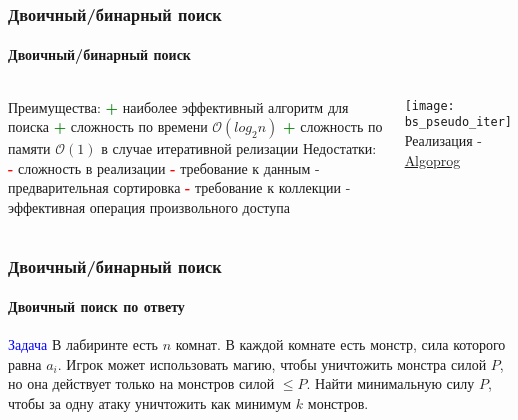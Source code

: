 \documentclass[aspectratio=169]{beamer}
\begin{document}
\begin{frame}
\frametitle{Двоичный/бинарный поиск}
\framesubtitle{Двоичный/бинарный поиск}
\begin{block}{}
\begin{columns}[]
\column{\dimexpr\linewidth-30mm}

Преимущества:\newline
\textcolor{green} {\textbf{+}} наиболее эффективный алгоритм для поиска\newline
\textcolor{green} {\textbf{+}} сложность по времени $\mathcal{O}(log_2 n)$\newline
\textcolor{green} {\textbf{+}} сложность по памяти $\mathcal{O}(1)$ в случае итеративной релизации\newline\newline
Недостатки:\newline
\textcolor{red} {\textbf{-}} сложность в реализации\newline
\textcolor{red} {\textbf{-}} требование к данным - предварительная сортировка \newline
\textcolor{red} {\textbf{-}} требование к коллекции - эффективная операция произвольного доступа \newline

\column{35mm}
\texttt{[image: bs\_pseudo\_iter]}
\center \tiny Реализация - \href{https://notes.algoprog.ru/binsearch/07_binsearch_main.html}{Algoprog}


\end{columns}
\end{block}
\end{frame}


\begin{frame}
\frametitle{Двоичный/бинарный поиск}
\framesubtitle{Двоичный поиск по ответу}
\justifying
\textcolor{blue}{Задача}\newline\newline
В лабиринте есть $n$ комнат. В каждой комнате есть монстр, сила которого равна $a_i$. Игрок может использовать магию, чтобы уничтожить монстра силой $P$, но она действует только на монстров силой $\leq P$. Найти минимальную силу $P$, чтобы за одну атаку уничтожить как минимум $k$ монстров.

\begin{figure}
    \captionsetup[subfigure]{labelformat=empty}
    \centering
   
\end{figure}
\end{frame}
\end{document}
